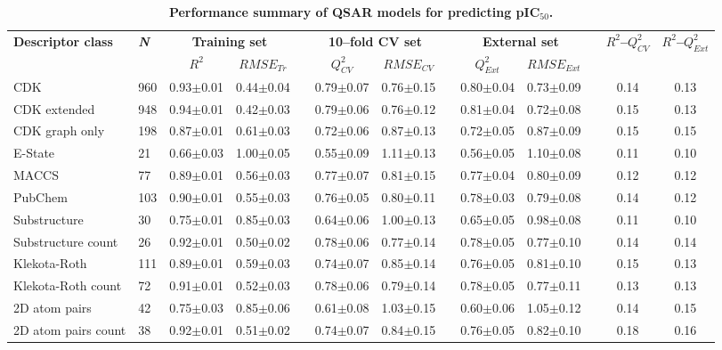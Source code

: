 \documentclass[fleqn,10pt]{wlpeerj}
\newcommand\T{\rule{0pt}{4ex}}       %
\newcommand\B{\rule[-2ex]{0pt}{0pt}} %
\begin{document}
\begin{table}
\caption{\textbf{Performance summary of QSAR models for predicting pIC$_{50}$.}}
\label{performance_random_forest}
\setlength\tabcolsep{10pt} %
\small
\begin{tabular}{llccccccccccc}
\hline
\textbf{Descriptor class}  & \textbf{\textit{N}} & \multicolumn{2}{c}{\textbf{Training set}} &  & \multicolumn{2}{c}{\textbf{10--fold CV set}} &  & \multicolumn{2}{c}{\textbf{External set}} &  & \multirow{2}{*}{\textbf{$R^{2}$--$Q^{2}_{CV}$}} & \multirow{2}{*}{\textbf{$R^{2}$--$Q^{2}_{Ext}$}} \T\B \\
\cline{9-10} \cline{6-7} \cline{3-4}
 &   & \textbf{$R^{2}$} & \textbf{$RMSE_{Tr}$} &  & \textbf{$Q^{2}_{CV}$} & \textbf{$RMSE_{CV}$} &  & \textbf{$Q^{2}_{Ext}$} & \textbf{$RMSE_{Ext}$} &  &  &  \T\B \\ 
\hline
CDK & 960  & 0.93$\pm$0.01 & 0.44$\pm$0.04 &  & 0.79$\pm$0.07 & 0.76$\pm$0.15 &  & 0.80$\pm$0.04 &  0.73$\pm$0.09 &  & 0.14 & 0.13 \T \\
CDK extended & 948  & 0.94$\pm$0.01 & 0.42$\pm$0.03 &  & 0.79$\pm$0.06 & 0.76$\pm$0.12 &  & 0.81$\pm$0.04 & 0.72$\pm$0.08 &  & 0.15 & 0.13 \\
CDK graph only & 198  & 0.87$\pm$0.01 & 0.61$\pm$0.03 &  & 0.72$\pm$0.06 & 0.87$\pm$0.13 &  & 0.72$\pm$0.05 & 0.87$\pm$0.09 &  & 0.15 & 0.15 \\
E-State & 21  & 0.66$\pm$0.03 & 1.00$\pm$0.05 &  & 0.55$\pm$0.09 & 1.11$\pm$0.13 &  & 0.56$\pm$0.05 & 1.10$\pm$0.08 &  & 0.11 & 0.10 \\
MACCS & 77  & 0.89$\pm$0.01 & 0.56$\pm$0.03 &  & 0.77$\pm$0.07 & 0.81$\pm$0.15 &  & 0.77$\pm$0.04 & 0.80$\pm$0.09 &  & 0.12 & 0.12 \\
PubChem & 103  & 0.90$\pm$0.01 & 0.55$\pm$0.03 &  & 0.76$\pm$0.05 & 0.80$\pm$0.11 &  & 0.78$\pm$0.03 & 0.79$\pm$0.08 &  & 0.14 & 0.12 \\
Substructure & 30  & 0.75$\pm$0.01 & 0.85$\pm$0.03 &  & 0.64$\pm$0.06 & 1.00$\pm$0.13 &  & 0.65$\pm$0.05 & 0.98$\pm$0.08 &  & 0.11 & 0.10 \\
Substructure count & 26  & 0.92$\pm$0.01 & 0.50$\pm$0.02 &  & 0.78$\pm$0.06 & 0.77$\pm$0.14 &  & 0.78$\pm$0.05 & 0.77$\pm$0.10 &  & 0.14 & 0.14 \\
Klekota-Roth & 111 & 0.89$\pm$0.01 & 0.59$\pm$0.03 &  & 0.74$\pm$0.07 & 0.85$\pm$0.14 &  & 0.76$\pm$0.05 & 0.81$\pm$0.10 &  & 0.15 & 0.13 \\
Klekota-Roth count & 72 & 0.91$\pm$0.01 & 0.52$\pm$0.03 &  & 0.78$\pm$0.06 & 0.79$\pm$0.14 &  & 0.78$\pm$0.05 & 0.77$\pm$0.11 &  & 0.13 & 0.13 \\
2D atom pairs & 42  & 0.75$\pm$0.03 & 0.85$\pm$0.06 &  & 0.61$\pm$0.08 & 1.03$\pm$0.15 &  & 0.60$\pm$0.06 & 1.05$\pm$0.12 &  & 0.14 & 0.15 \\
2D atom pairs count & 38 & 0.92$\pm$0.01 & 0.51$\pm$0.02 &  & 0.74$\pm$0.07 & 0.84$\pm$0.15 &  & 0.76$\pm$0.05 & 0.82$\pm$0.10 &  & 0.18 & 0.16 \B \\
\hline
\end{tabular}
\end{table}
\end{document}
